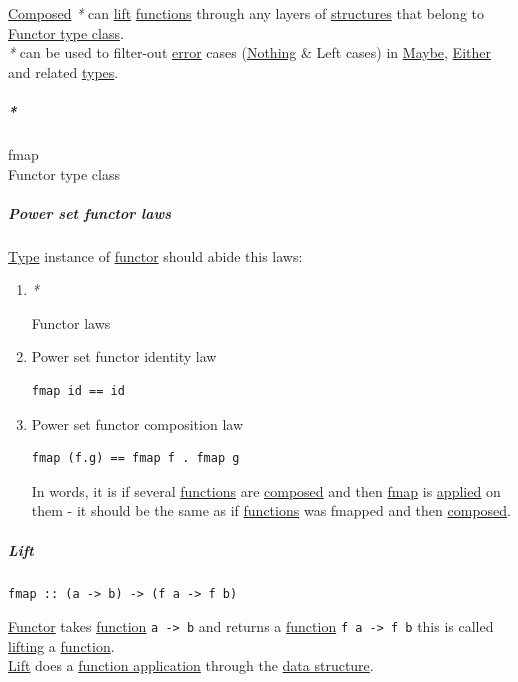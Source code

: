 \documentclass[11pt]{article}
\begin{document}
\hyperref[orgb941f76]{Composed} \emph{*} can \hyperref[org70ed855]{lift} \hyperref[org66c5288]{functions} through any layers of \hyperref[org51d1eff]{structures} that belong to \hyperref[org0e7b59c]{Functor type class}.\\

\emph{*} can be used to filter-out \hyperref[orgb69b647]{error} cases (\hyperref[org235dcde]{Nothing} \& Left cases) in \hyperref[orga420584]{Maybe}, \hyperref[orgbc5fdf7]{Either} and related \hyperref[org3927fd9]{types}.\\

\subparagraph{\emph{*}}
\label{sec:org0890fc9}

\label{org48f5bd6}fmap\\
\label{org0e7b59c}Functor type class\\

\subparagraph{\label{orge38b7aa}Power set functor laws}
\label{sec:org42fa8c6}
\hyperref[org4fbaeb8]{Type} instance of \hyperref[org6073683]{functor} should abide this laws:\\

\begin{enumerate}
\item \emph{*}
\label{sec:orgf1bb263}

\label{org6ae8c48}Functor laws\\

\item \label{orga0e9cb5}Power set functor identity law
\label{sec:orga7a0693}
\begin{verbatim}
fmap id == id
\end{verbatim}

\item \label{org65138d0}Power set functor composition law
\label{sec:org8bf74f3}
\begin{verbatim}
fmap (f.g) == fmap f . fmap g
\end{verbatim}
In words, it is if several \hyperref[org66c5288]{functions} are \hyperref[orgb941f76]{composed} and then \hyperref[org48f5bd6]{fmap} is \hyperref[org848eb1f]{applied} on them - it should be the same as if \hyperref[org66c5288]{functions} was fmapped and then \hyperref[orgb941f76]{composed}.\\
\end{enumerate}

\subparagraph{\label{org70ed855}Lift}
\label{sec:org8549576}
\begin{verbatim}
fmap :: (a -> b) -> (f a -> f b)
\end{verbatim}
\hyperref[org6073683]{Functor} takes \hyperref[orgeb5cddb]{function} \texttt{a -> b} and returns a \hyperref[orgeb5cddb]{function} \texttt{f a -> f b} this is called \hyperref[org1674a1b]{lifting} a \hyperref[orgeb5cddb]{function}.\\
\hyperref[org70ed855]{Lift} does a \hyperref[org6ff03b0]{function application} through the \hyperref[org47669ca]{data structure}.\\
\end{document}
